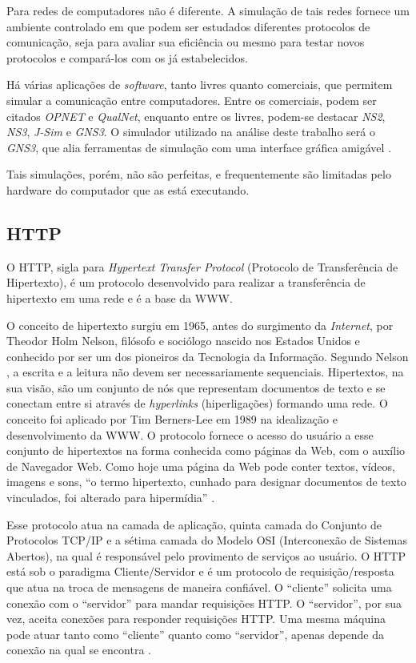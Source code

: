 Para redes de computadores não é diferente. A simulação de tais redes fornece um ambiente controlado em que podem ser estudados diferentes protocolos de comunicação, seja para avaliar sua eficiência ou mesmo para testar novos protocolos e compará-los com os já estabelecidos.

Há várias aplicações de \textit{software}, tanto livres quanto comerciais, que permitem simular a comunicação entre computadores. Entre os comerciais, podem ser citados \textit{OPNET} e \textit{QualNet}, enquanto entre os livres, podem-se destacar \textit{NS2}, \textit{NS3}, \textit{J-Sim} e \textit{GNS3}. O simulador utilizado na análise deste trabalho será o \textit{GNS3}, que alia ferramentas de simulação com uma interface gráfica amigável \cite{redesSim}.

Tais simulações, porém, não são perfeitas, e frequentemente são limitadas pelo hardware do computador que as está executando.

\subsection{HTTP}
O HTTP, sigla para \textit{Hypertext Transfer Protocol} (Protocolo de Transferência de Hipertexto), é um protocolo desenvolvido para realizar a transferência de hipertexto em uma rede e é a base da WWW.

O conceito de hipertexto surgiu em 1965, antes do surgimento da \textit{Internet}, por Theodor Holm Nelson, filósofo e sociólogo nascido nos Estados Unidos e conhecido por ser um dos pioneiros da Tecnologia da Informação. Segundo Nelson \cite{theodorenelson1981}, a escrita e a leitura não devem ser necessariamente sequenciais. Hipertextos, na sua visão, são um conjunto de nós que representam documentos de texto e se conectam entre si através de \textit{hyperlinks} (hiperligações) formando uma rede. O conceito foi aplicado por Tim Berners-Lee em 1989 na idealização e desenvolvimento da WWW. O protocolo fornece o acesso do usuário a esse conjunto de hipertextos na forma conhecida como páginas da Web, com o auxílio de Navegador Web. Como hoje uma página da Web pode conter textos, vídeos, imagens e sons, “o termo hipertexto, cunhado para designar documentos de texto vinculados, foi alterado para hipermídia”  \cite{behrouza.forouzan2013}.

Esse protocolo atua na camada de aplicação, quinta camada do Conjunto de Protocolos TCP/IP e a sétima camada do Modelo OSI (Interconexão de Sistemas Abertos), na qual é responsável pelo provimento de serviços ao usuário.
O HTTP está sob o paradigma Cliente/Servidor e é um protocolo de requisição/resposta que atua na troca de mensagens de maneira confiável. O “cliente” solicita uma conexão com o “servidor” para mandar requisições HTTP. O “servidor”, por sua vez, aceita conexões para responder requisições HTTP. Uma mesma máquina pode atuar tanto como “cliente” quanto como “servidor”, apenas depende da conexão na qual se encontra \cite{rfc7230}.

